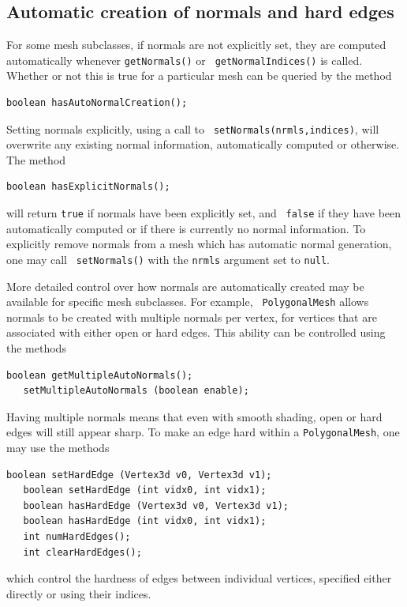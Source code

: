 \subsection{Automatic creation of normals and hard edges}
\label{AutoNormalCreation:sec}

For some mesh subclasses, if normals are not explicitly set, they are
computed automatically whenever {\tt getNormals()} or {\tt
getNormalIndices()} is called. Whether or not this is true
for a particular mesh can be queried by the method
\begin{lstlisting}[]
   boolean hasAutoNormalCreation();
\end{lstlisting}
%
Setting normals explicitly, using a call to {\tt
setNormals(nrmls,indices)}, will overwrite any existing normal information,
automatically computed or otherwise. The method
\begin{lstlisting}[]
   boolean hasExplicitNormals();
\end{lstlisting}
%
will return {\tt true} if normals have been explicitly set, and {\tt
false} if they have been automatically computed or if there is
currently no normal information. To explicitly remove normals from a
mesh which has automatic normal generation, one may call {\tt
setNormals()} with the {\tt nrmls} argument set to {\tt null}.

More detailed control over how normals are automatically created may
be available for specific mesh subclasses. For example, {\tt
PolygonalMesh} allows normals to be created with multiple normals per
vertex, for vertices that are associated with either open or hard
edges. This ability can be controlled using the methods
\begin{lstlisting}[]
   boolean getMultipleAutoNormals();
   setMultipleAutoNormals (boolean enable);
\end{lstlisting}
%
Having multiple normals means that even with smooth shading, open or
hard edges will still appear sharp. To make an edge hard within
a {\tt PolygonalMesh}, one may use the methods
\begin{lstlisting}[]
   boolean setHardEdge (Vertex3d v0, Vertex3d v1);
   boolean setHardEdge (int vidx0, int vidx1);
   boolean hasHardEdge (Vertex3d v0, Vertex3d v1);
   boolean hasHardEdge (int vidx0, int vidx1);
   int numHardEdges();
   int clearHardEdges();
\end{lstlisting}
%
which control the hardness of edges between individual vertices,
specified either directly or using their indices.

